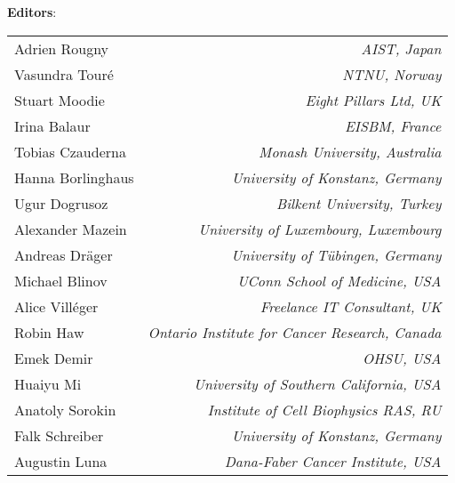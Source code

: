 \begin{titlepage}
\begin{center}
\vspace{0.5in}
\textbf{\sffamily Editors}:\\[7pt]
% 
% 
\begin{tabular}{l>{\hspace*{15pt}}r}
Adrien Rougny   & \emph{AIST, Japan}\\
Vasundra Touré   & \emph{NTNU, Norway}\\
Stuart Moodie   & \emph{Eight Pillars Ltd, UK}\\
Irina Balaur & \emph{EISBM, France}\\
Tobias Czauderna   & \emph{Monash University, Australia}\\
Hanna Borlinghaus & \emph{University of Konstanz, Germany}\\
Ugur Dogrusoz   & \emph{Bilkent University, Turkey}\\
Alexander Mazein   & \emph{University of Luxembourg, Luxembourg}\\
Andreas Dräger   & \emph{University of Tübingen, Germany}\\
Michael Blinov & \emph{UConn School of Medicine, USA}\\
Alice Vill\'{e}ger   & \emph{Freelance IT Consultant, UK}\\
Robin Haw   & \emph{Ontario Institute for Cancer Research, Canada}\\
Emek Demir    & \emph{OHSU, USA}\\
Huaiyu Mi	& \emph{University of Southern California, USA}\\
Anatoly Sorokin   & \emph{Institute of Cell Biophysics RAS, RU}\\ 
Falk Schreiber	 & \emph{University of Konstanz, Germany}\\
Augustin Luna   & \emph{Dana-Faber Cancer Institute, USA}\\
\end{tabular}


\end{center}
\end{titlepage}
